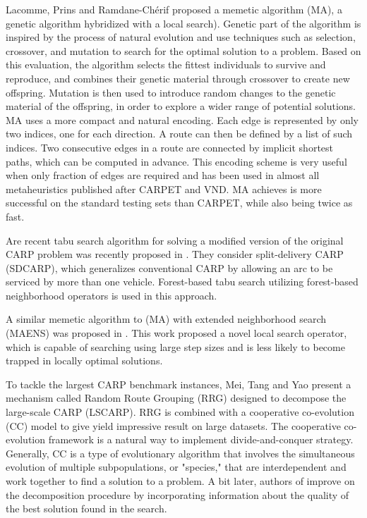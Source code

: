 \documentclass[twoside]{ctuthesis}
\theoremstyle{plain}
\theoremstyle{definition}
\theoremstyle{note}
\begin{document}
Lacomme, Prins and Ramdane-Ch{\'e}rif \cite{lacomme2001genetic} proposed a memetic algorithm (MA), a genetic algorithm hybridized with a local search). Genetic part of the algorithm is inspired by the process of natural evolution and use techniques such as selection, crossover, and mutation to search for the optimal solution to a problem. Based on this evaluation, the algorithm selects the fittest individuals to survive and reproduce, and combines their genetic material through crossover to create new offspring. Mutation is then used to introduce random changes to the genetic material of the offspring, in order to explore a wider range of potential solutions. MA uses a more compact and natural encoding. Each edge is represented by only two indices, one for each direction. A route can then be defined by a list of such indices. Two consecutive edges in a route are connected by implicit shortest paths, which can be computed in advance. This encoding scheme is very useful when only fraction of edges are required and has been used in almost all metaheuristics published after CARPET and VND. MA achieves is more successful on the standard testing sets than CARPET, while also being twice as fast.

Are recent tabu search algorithm for solving a modified version of the original CARP problem was recently proposed in \cite{lai2018forest}. They consider split-delivery CARP (SDCARP), which generalizes conventional CARP by allowing an arc to be serviced by more than one vehicle. Forest-based tabu search utilizing forest-based neighborhood operators is used in this approach.

A similar memetic algorithm to (MA) with extended neighborhood search (MAENS) was proposed in \cite{tang2009memetic}. This work proposed a novel local search operator, which is capable of searching using large step sizes and is less likely to become trapped in locally optimal solutions.

To tackle the largest CARP benchmark instances, Mei, Tang and Yao \cite{mei2013decomposing} present a mechanism called Random Route Grouping (RRG) designed to decompose the large-scale CARP (LSCARP). RRG is combined with a cooperative co-evolution (CC) model to give yield impressive result on large datasets. The cooperative co-evolution framework is a natural way to implement divide-and-conquer strategy. Generally, CC is a type of evolutionary algorithm that involves the simultaneous evolution of multiple subpopulations, or "species," that are interdependent and work together to find a solution to a problem. A bit later, authors of \cite{mei2014variable} improve on the decomposition procedure by incorporating information about the quality of the best solution found in the search.
\end{document}

